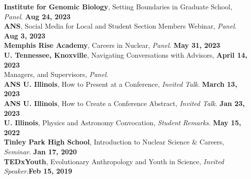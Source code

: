 \documentclass[margin,line]{resume}
\begin{document}
\begin{resume}
    \textbf{Institute for Genomic Biology}, Setting Boundaries in Graduate School, \emph{Panel}. \hfill \textbf{Aug 24, 2023}\\
    \textbf{ANS}, Social Media for Local and Student Section Members Webinar, \emph{Panel}. \hfill\textbf{Aug 3, 2023}\\
    \textbf{Memphis Rise Academy}, Careers in Nuclear, \emph{Panel}. \hfill\textbf{May 31, 2023}\\
    \textbf{U. Tennessee, Knoxville}, Navigating Conversations with Advisors,  \hfill\textbf{April 14, 2023}\\
    Managers, and Supervisors, \emph{Panel}.\\
    \textbf{ANS U. Illinois}, How to Present at a Conference, \emph{Invited Talk}.  \hfill\textbf{March 13, 2023}\\
    \textbf{ANS U. Illinois}, How to Create a Conference Abstract, \emph{Invited Talk}.  \hfill\textbf{Jan 23, 2023}\\
    \textbf{U. Illinois}, Physics and Astronomy Convocation, \emph{Student Remarks}.  \hfill\textbf{May 15, 2022}\\
    \textbf{Tinley Park High School}, Introduction to Nuclear Science \& Careers, \emph{Seminar}.  \hfill\textbf{Jan 17, 2020}\\
    \textbf{TEDxYouth}, Evolutionary Anthropology and Youth in Science, \emph{Invited Speaker}.\hfill\textbf{Feb 15, 2019}\\



\end{resume}
\end{document}
